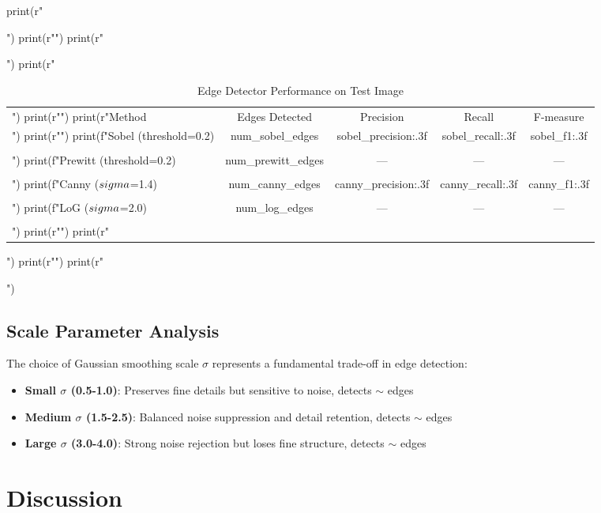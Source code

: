 \documentclass[a4paper, 11pt]{article}
\begin{document}
\begin{pycode}
print(r"\begin{table}[htbp]")
print(r"\centering")
print(r"\caption{Edge Detector Performance on Test Image}")
print(r"\begin{tabular}{lcccc}")
print(r"\toprule")
print(r"Method & Edges Detected & Precision & Recall & F-measure \\")
print(r"\midrule")
print(f"Sobel (threshold=0.2) & {num_sobel_edges} & {sobel_precision:.3f} & {sobel_recall:.3f} & {sobel_f1:.3f} \\\\")
print(f"Prewitt (threshold=0.2) & {num_prewitt_edges} & --- & --- & --- \\\\")
print(f"Canny ($\\sigma$=1.4) & {num_canny_edges} & {canny_precision:.3f} & {canny_recall:.3f} & {canny_f1:.3f} \\\\")
print(f"LoG ($\\sigma$=2.0) & {num_log_edges} & --- & --- & --- \\\\")
print(r"\bottomrule")
print(r"\end{tabular}")
print(r"\label{tab:performance}")
print(r"\end{table}")
\end{pycode}

\subsection{Scale Parameter Analysis}

The choice of Gaussian smoothing scale $\sigma$ represents a fundamental trade-off in edge detection:

\begin{itemize}
\item \textbf{Small $\sigma$ (0.5-1.0)}: Preserves fine details but sensitive to noise, detects $\sim$ edges
\item \textbf{Medium $\sigma$ (1.5-2.5)}: Balanced noise suppression and detail retention, detects $\sim$ edges
\item \textbf{Large $\sigma$ (3.0-4.0)}: Strong noise rejection but loses fine structure, detects $\sim$ edges
\end{itemize}

\section{Discussion}
\end{document}
